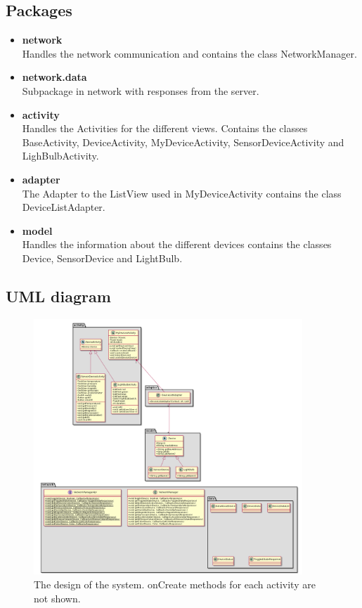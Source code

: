 \documentclass[a4paper]{article}
\begin{document}
	\subsection{Packages}
	\begin{itemize}
		\item {\textbf{network}} \\
        Handles the network communication and contains the class NetworkManager.
        \item {\textbf{network.data}} \\
        Subpackage in network with responses from the server.
		\item {\textbf{activity}}\\
        Handles the Activities for the different views. Contains the classes BaseActivity, DeviceActivity, MyDeviceActivity, SensorDeviceActivity and LighBulbActivity.
		\item {\textbf{adapter}}\\
        The Adapter to the ListView used in MyDeviceActivity contains the class DeviceListAdapter.
		\item {\textbf{model}}\\
        Handles the information about the different devices contains the classes Device, SensorDevice and LightBulb.
	\end{itemize}
\subsection{UML diagram}
	\begin{figure}[H]
    \centering
    \includegraphics[width=0.9\textwidth]{class_diagram.png}
    \caption{The design of the system. onCreate methods for each activity are not shown.}
    \label{fig:uml}
\end{figure}
\end{document}
